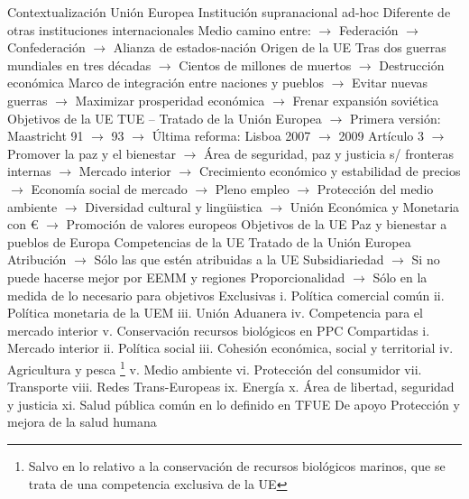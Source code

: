 \documentclass{nuevotema}
\begin{document}
\esquemalargo

\begin{esquemal}
	\1[] 
		\2 Contextualización
			\3 Unión Europea
				\4 Institución supranacional ad-hoc
				\4[] Diferente de otras instituciones internacionales
				\4[] Medio camino entre:
				\4[] $\to$ Federación
				\4[] $\to$ Confederación
				\4[] $\to$ Alianza de estados-nación
				\4 Origen de la UE
				\4[] Tras dos guerras mundiales en tres décadas
				\4[] $\to$ Cientos de millones de muertos
				\4[] $\to$ Destrucción económica
				\4[] Marco de integración entre naciones y pueblos
				\4[] $\to$ Evitar nuevas guerras
				\4[] $\to$ Maximizar prosperidad económica
				\4[] $\to$ Frenar expansión soviética
				\4 Objetivos de la UE
				\4[] TUE -- Tratado de la Unión Europea
				\4[] $\to$ Primera versión: Maastricht 91 $\to$ 93
				\4[] $\to$ Última reforma: Lisboa 2007 $\to$ 2009
				\4[] Artículo 3
				\4[] $\to$ Promover la paz y el bienestar
				\4[] $\to$ Área de seguridad, paz y justicia s/ fronteras internas
				\4[] $\to$ Mercado interior
				\4[] $\to$ Crecimiento económico y estabilidad de precios
				\4[] $\to$ Economía social de mercado
				\4[] $\to$ Pleno empleo
				\4[] $\to$ Protección del medio ambiente
				\4[] $\to$ Diversidad cultural y lingüistica
				\4[] $\to$ Unión Económica y Monetaria con €
				\4[] $\to$ Promoción de valores europeos
				\4[$\to$] Objetivos de la UE
				\4[] Paz y bienestar a pueblos de Europa
			\3 Competencias de la UE
				\4 Tratado de la Unión Europea
				\4[] Atribución
				\4[] $\to$ Sólo las que estén atribuidas a la UE
				\4[] Subsidiariedad
				\4[] $\to$ Si no puede hacerse mejor por EEMM y regiones
				\4[] Proporcionalidad
				\4[] $\to$ Sólo en la medida de lo necesario para objetivos
				\4 Exclusivas
				\4[] i. Política comercial común
				\4[] ii. Política monetaria de la UEM
				\4[] iii. Unión Aduanera
				\4[] iv. Competencia para el mercado interior
				\4[] v. Conservación recursos biológicos en PPC
				\4 Compartidas
				\4[] i. Mercado interior
				\4[] ii. Política social
				\4[] iii. Cohesión económica, social y territorial
				\4[] iv. Agricultura y pesca \footnote{Salvo en lo relativo a la conservación de recursos biológicos marinos, que se trata de una competencia exclusiva de la UE}
				\4[] v. Medio ambiente
				\4[] vi. Protección del consumidor
				\4[] vii. Transporte
				\4[] viii. Redes Trans-Europeas
				\4[] ix. Energía
				\4[] x. Área de libertad, seguridad y justicia
				\4[] xi. Salud pública común en lo definido en TFUE
				\4 De apoyo
				\4[] Protección y mejora de la salud humana

\end{esquemal}
\end{document}
